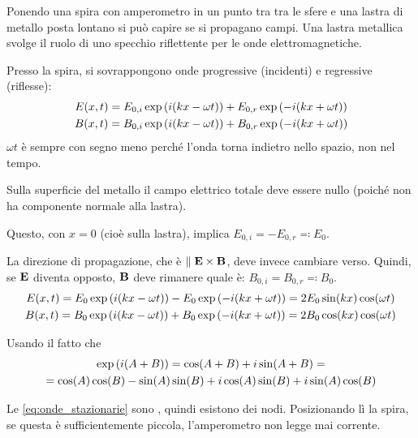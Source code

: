 Ponendo una spira con amperometro in un punto tra tra le sfere e una lastra di metallo posta lontano si può capire se si propagano campi.
Una lastra metallica svolge il ruolo di uno specchio riflettente per le onde elettromagnetiche.

Presso la spira, si sovrappongono onde progressive (incidenti) e regressive (riflesse):
\begin{subequations}
\begin{gather}
    E(x, t) = E_{0,i}\operatorname{exp}\left( i(kx - \omega t) \right) + E_{0,r}\operatorname{exp}\left( -i(kx + \omega t) \right) \\
    B(x, t) = B_{0,i}\operatorname{exp}\left( i(kx - \omega t) \right) + B_{0,r}\operatorname{exp}\left( -i(kx + \omega t) \right)
\end{gather}
\end{subequations}
$\omega t$ è sempre con segno meno perché l'onda torna indietro nello spazio, non nel tempo.

Sulla superficie del metallo il campo elettrico totale deve essere nullo (poiché non ha componente normale alla lastra).

Questo, con $x = 0$ (cioè sulla lastra), implica $E_{0,i} = - E_{0,r} \eqcolon E_0$.

La direzione di propagazione, che è $\parallel \mathbf{E} \times \mathbf{B}$, deve invece cambiare verso.
Quindi, se $\mathbf{E}$ diventa opposto, $\mathbf{B}$ deve rimanere quale è: $B_{0,i} = B_{0,r} \eqcolon B_0$.
\begin{subequations}
\label{eq:onde_stazionarie}
\begin{gather}
    E(x, t) = E_0\operatorname{exp}\left( i(kx - \omega t) \right) - E_0\operatorname{exp}\left( -i(kx + \omega t) \right)
    = 2 E_0 \sin(kx) \cos(\omega t) \\
    B(x, t) = B_0\operatorname{exp}\left( i(kx - \omega t) \right) + B_0\operatorname{exp}\left( -i(kx + \omega t) \right)
    = 2 B_0 \cos(kx) \cos(\omega t)
\end{gather}
\end{subequations}

Usando il fatto che
\begin{equation}
\begin{gathered}
    \operatorname{exp}\left( i (A + B) \right) = \cos(A + B) + i \sin(A + B)
    = \\
    = \cos(A) \cos(B) - \sin(A) \sin(B) + i \cos(A) \sin(B) + i \sin(A) \cos(B)
\end{gathered}
\end{equation}

Le \eqref{eq:onde_stazionarie} sono , quindi esistono dei nodi.
Posizionando lì la spira, se questa è sufficientemente piccola, l'amperometro non legge mai corrente.

